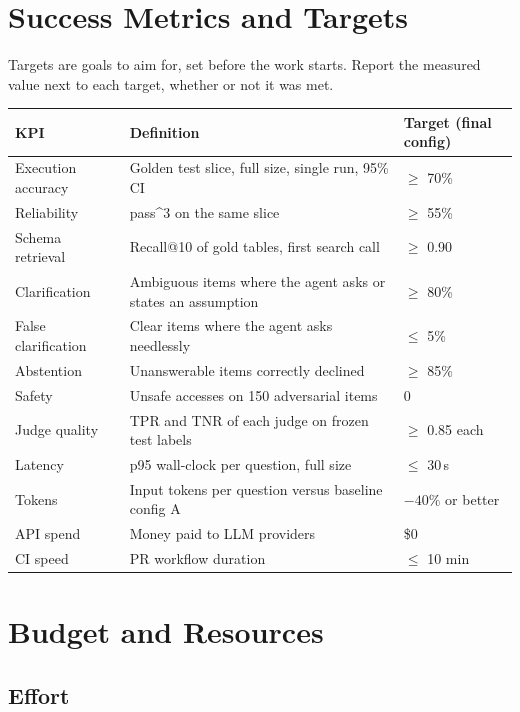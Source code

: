 \documentclass[11pt,a4paper]{article}
\begin{document}
\section{Success Metrics and Targets}

Targets are goals to aim for, set before the work starts. Report the measured value next to
each target, whether or not it was met.

\begin{center}
\small
\begin{tabularx}{\linewidth}{@{}l X l@{}}
\toprule
\textbf{KPI} & \textbf{Definition} & \textbf{Target (final config)}\\
\midrule
Execution accuracy & Golden test slice, full size, single run, 95\% CI & $\geq$ 70\%\\
Reliability & pass\^{}3 on the same slice & $\geq$ 55\%\\
Schema retrieval & Recall@10 of gold tables, first search call & $\geq$ 0.90\\
Clarification & Ambiguous items where the agent asks or states an assumption & $\geq$ 80\%\\
False clarification & Clear items where the agent asks needlessly & $\leq$ 5\%\\
Abstention & Unanswerable items correctly declined & $\geq$ 85\%\\
Safety & Unsafe accesses on 150 adversarial items & 0\\
Judge quality & TPR and TNR of each judge on frozen test labels & $\geq$ 0.85 each\\
Latency & p95 wall-clock per question, full size & $\leq$ 30\,s\\
Tokens & Input tokens per question versus baseline config A & $-40\%$ or better\\
API spend & Money paid to LLM providers & \$0\\
CI speed & PR workflow duration & $\leq$ 10 min\\
\bottomrule
\end{tabularx}
\end{center}

\section{Budget and Resources}

\subsection{Effort}
\end{document}
